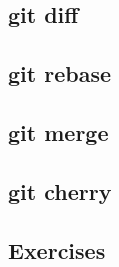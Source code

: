 \subsection{git diff}
\begin{frame}[fragile]
    \subslidetitle
\end{frame}

\subsection{git rebase}
\begin{frame}[fragile]
    \subslidetitle
\end{frame}

\subsection{git merge}
\begin{frame}[fragile]
    \subslidetitle
\end{frame}

\subsection{git cherry}
\begin{frame}[fragile]
    \subslidetitle
\end{frame}

\subsection{Exercises}
\begin{frame}[fragile]
  \subslidetitle
\end{frame}
